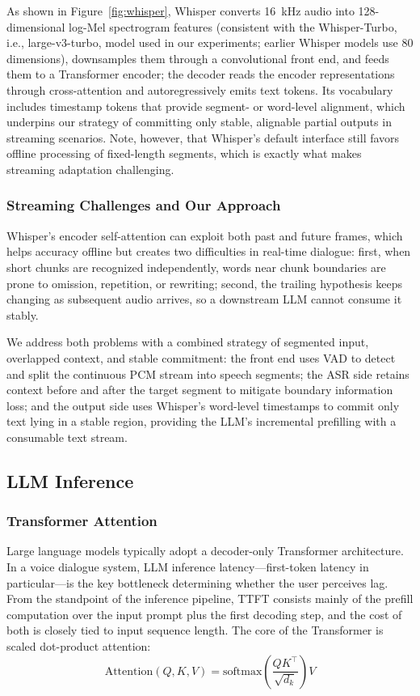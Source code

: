 \documentclass[pdflatex,iicol,Numbered,sn-basic]{sn-jnl}%
\begin{document}
As shown in Figure~\ref{fig:whisper}, Whisper converts 16~kHz audio into 128-dimensional log-Mel spectrogram features (consistent with the Whisper-Turbo, i.e., large-v3-turbo, model used in our experiments; earlier Whisper models use 80 dimensions), downsamples them through a convolutional front end, and feeds them to a Transformer encoder; the decoder reads the encoder representations through cross-attention and autoregressively emits text tokens. Its vocabulary includes timestamp tokens that provide segment- or word-level alignment, which underpins our strategy of committing only stable, alignable partial outputs in streaming scenarios. Note, however, that Whisper's default interface still favors offline processing of fixed-length segments, which is exactly what makes streaming adaptation challenging.

\subsubsection{Streaming Challenges and Our Approach}

Whisper's encoder self-attention can exploit both past and future frames, which helps accuracy offline but creates two difficulties in real-time dialogue: first, when short chunks are recognized independently, words near chunk boundaries are prone to omission, repetition, or rewriting; second, the trailing hypothesis keeps changing as subsequent audio arrives, so a downstream LLM cannot consume it stably.

We address both problems with a combined strategy of segmented input, overlapped context, and stable commitment: the front end uses VAD to detect and split the continuous PCM stream into speech segments; the ASR side retains context before and after the target segment to mitigate boundary information loss; and the output side uses Whisper's word-level timestamps to commit only text lying in a stable region, providing the LLM's incremental prefilling with a consumable text stream.

\subsection{LLM Inference}

\subsubsection{Transformer Attention}

Large language models typically adopt a decoder-only Transformer architecture. In a voice dialogue system, LLM inference latency---first-token latency in particular---is the key bottleneck determining whether the user perceives lag. From the standpoint of the inference pipeline, TTFT consists mainly of the prefill computation over the input prompt plus the first decoding step, and the cost of both is closely tied to input sequence length. The core of the Transformer is scaled dot-product attention:
\begin{equation}
\mathrm{Attention}(Q,K,V)=\mathrm{softmax}\!\left(\frac{QK^{\top}}{\sqrt{d_k}}\right)V
\label{eq:attention}
\end{equation}
\end{document}
